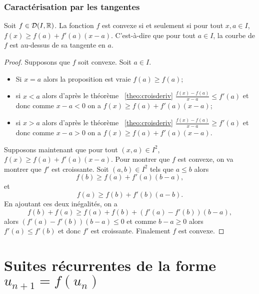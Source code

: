 \subsubsection{Caractérisation par les tangentes}

\begin{theo}
  Soit \(f \in \mathcal{D}(I,\mathbb{R})\). La fonction \(f\) est convexe si et seulement si 
  pour tout \(x,a \in I\), \(f(x) \geqslant f(a)+f'(a)(x-a)\). C'est-à-dire que 
  pour tout \(a \in I\), la courbe de \(f\) est au-dessus de sa tangente en 
  \(a\).
\end{theo}
\begin{proof}
  Supposons que \(f\) soit convexe. Soit \(a \in I\).
  \begin{itemize}
    \item Si \(x=a\) alors la proposition est vraie \(f(a) \geqslant f(a)\);
    \item si \(x < a\) alors d'après le théorème~
      \ref{theo:croisderiv} \(\frac{f(x)-f(a)}{x-a} \leqslant f'(a)\) et donc 
      comme \(x-a <0\) on a \(f(x) \geqslant f(a)+f'(a)(x-a)\);
    \item si \(x > a\) alors d'après le théorème~
      \ref{theo:croisderiv} \(\frac{f(x)-f(a)}{x-a} \geqslant f'(a)\) et donc 
      comme \(x-a >0\) on a \(f(x) \geqslant f(a)+f'(a)(x-a)\).
  \end{itemize}

  Supposons maintenant que  pour tout \((x,a) \in I^2\), \(f(x) \geqslant 
  f(a)+f'(a)(x-a)\). Pour montrer que \(f\) est convexe, on va montrer que 
  \(f'\) est croissante. Soit \((a,b) \in I^2\) tels que \(a \leqslant b\) alors
  \begin{equation}
    f(b) \geqslant f(a)+f'(a)(b-a),
  \end{equation}
  et
  \begin{equation}
    f(a) \geqslant f(b)+f'(b)(a-b).
  \end{equation}
  En ajoutant ces deux inégalités, on a
  \begin{equation}
    f(b)+f(a) \geqslant f(a)+f(b) +(f'(a)-f'(b))(b-a),
  \end{equation}
  alors \((f'(a)-f'(b))(b-a) \leqslant 0\) et comme \(b-a \geqslant 0\) alors 
  \(f'(a) \leqslant f'(b)\) et donc \(f'\) est croissante. Finalement \(f\) est 
  convexe.
\end{proof}

\section{Suites récurrentes de la forme \(u_{n+1}=f(u_n)\)}

